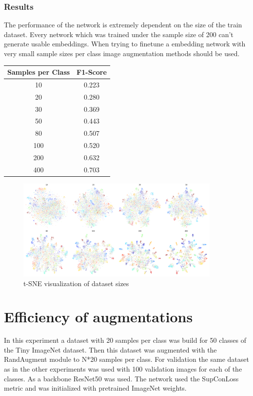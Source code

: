 \documentclass[12pt,a4paper]{report}
\newcommand{\splitlayout}[2]{
	\begin{minipage}{0.6\textwidth}
		#1
	\end{minipage}
	\hfill
	\begin{minipage}{0.35\textwidth}
		#2
	\end{minipage}	
}
\begin{document}
\subsubsection{Results}
\splitlayout{
	The performance of the network is extremely dependent on the size of the train dataset.
	Every network which was trained under the sample size of 200 can't generate usable embeddings.
	When trying to finetune a embedding network with very small sample sizes per class image augmentation methods should be used. 
}{
	\begin{tabular}{ | c | c | }
		\hline
		Samples per Class &  F1-Score \\ 
		\hline
		10 &  0.223 \\ 
		\hline
		20 & 0.280 \\ 
		\hline
		30 & 0.369 \\ 
		\hline
		50 & 0.443 \\ 
		\hline
		80 & 0.507  \\ 
		\hline
		100 & 0.520 \\ 
		\hline
		200 & 0.632 \\ 
		\hline
		400 & 0.703 \\ 
		\hline
	\end{tabular}
}

\begin{figure}[hb]
	\centering
	\includegraphics[width=0.9\textwidth]{../plots/dataset_size.png}
	\caption{t-SNE visualization of dataset sizes}
\end{figure}

\newpage

\section{Efficiency of augmentations}

In this experiment a dataset with 20 samples per class was build for 50 classes of the Tiny ImageNet dataset.
Then this dataset was augmented with the RandAugment module to N*20 samples per class.
For validation the same dataset as in the other experiments was used with 100 validation images for each of the classes.
As a backbone ResNet50 was used.
The network used the SupConLoss metric and was initialized with pretrained ImageNet weights.
\end{document}
